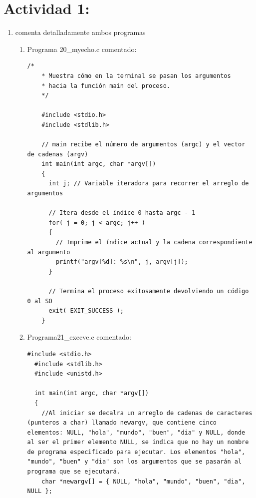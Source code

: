\documentclass[letterpaper,11pt]{article}
\begin{document}


\newpage
{\hypersetup{linkcolor=black}\tableofcontents}
\thispagestyle{empty}

\newpage

\setcounter{page}{1}
\singlespacing

\section{Actividad 1:}

\begin{enumerate}[label=\alph*)]
  \item comenta detalladamente ambos programas 
  \begin{enumerate}[label=\arabic*.]
    \item Programa 20\_myecho.c comentado: 
    \begin{lstlisting}[style=cstyle, caption={Programa 20\_myecho.c comentado}, label={lst:programa20_myecho_comentado}]
    /*
    * Muestra cómo en la terminal se pasan los argumentos 
    * hacia la función main del proceso.
    */

    #include <stdio.h>   
    #include <stdlib.h>  

    // main recibe el número de argumentos (argc) y el vector de cadenas (argv)
    int main(int argc, char *argv[])
    {
      int j; // Variable iteradora para recorrer el arreglo de argumentos

      // Itera desde el índice 0 hasta argc - 1
      for( j = 0; j < argc; j++ )
      {
        // Imprime el índice actual y la cadena correspondiente al argumento
        printf("argv[%d]: %s\n", j, argv[j]);
      }

      // Termina el proceso exitosamente devolviendo un código 0 al SO
      exit( EXIT_SUCCESS );
    }
    \end{lstlisting}
    \item Programa21\_execve.c comentado:
    \begin{lstlisting}[style=cstyle, caption={Programa 21\_execve.c comentado}, label={lst:programa21_execve_comentado}]
  #include <stdio.h>
  #include <stdlib.h>
  #include <unistd.h>

  int main(int argc, char *argv[])
  {
    //Al iniciar se decalra un arreglo de cadenas de caracteres (punteros a char) llamado newargv, que contiene cinco elementos: NULL, "hola", "mundo", "buen", "dia" y NULL, donde al ser el primer elemento NULL, se indica que no hay un nombre de programa especificado para ejecutar. Los elementos "hola", "mundo", "buen" y "dia" son los argumentos que se pasarán al programa que se ejecutará.
    char *newargv[] = { NULL, "hola", "mundo", "buen", "dia",  NULL };


\end{lstlisting}
\end{enumerate}
\end{enumerate}
\end{document}
